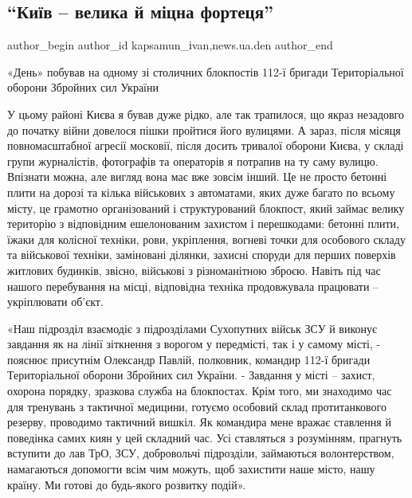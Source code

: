  
 
 
 
 
 
\subsection{\enquote{Київ – велика й міцна фортеця}}
\label{sec:29_03_2022.stz.news.ua.den.1.kiev_fortecja}
 
\ifcmt
 author_begin
   author_id kapsamun_іvan,news.ua.den
 author_end
\fi

\begin{zznagolos}
«День» побував на одному зі столичних блокпостів 112-ї бригади Територіальної
оборони Збройних сил України	
\end{zznagolos}

У цьому районі Києва я бував дуже рідко, але так трапилося, що якраз незадовго
до початку війни довелося пішки пройтися його вулицями. А зараз, після місяця
повномасштабної агресії московії, після досить тривалої оборони Києва, у складі
групи журналістів, фотографів та операторів я потрапив на ту саму вулицю.
Впізнати можна, але вигляд вона має вже зовсім інший. Це не просто бетонні
плити на дорозі та кілька військових з автоматами, яких дуже багато по всьому
місту, це грамотно організований і структурований блокпост, який займає велику
територію з відповідним ешелонованим захистом і перешкодами: бетонні плити,
їжаки для колісної техніки, рови, укріплення, вогневі точки для особового
складу та військової техніки, заміновані ділянки, захисні споруди для перших
поверхів житлових будинків, звісно, військові з різноманітною зброєю. Навіть
під час нашого перебування на місці, відповідна техніка продовжувала працювати
– укріплювати об'єкт.


«Наш підрозділ взаємодіє з підрозділами Сухопутних військ ЗСУ й виконує
завдання як на лінії зіткнення з ворогом у передмісті, так і у самому місті, -
пояснює присутнім Олександр Павлій, полковник, командир 112-ї бригади
Територіальної оборони Збройних сил України. - Завдання у місті – захист,
охорона порядку, зразкова служба на блокпостах. Крім того, ми знаходимо час для
тренувань з тактичної медицини, готуємо особовий склад протитанкового резерву,
проводимо тактичний вишкіл. Як командира мене вражає ставлення й поведінка
самих киян у цей складний час. Усі ставляться з розумінням, прагнуть вступити
до лав ТрО, ЗСУ, добровольчі підрозділи, займаються волонтерством, намагаються
допомогти всім чим можуть, щоб захистити наше місто, нашу країну. Ми готові до
будь-якого розвитку подій».

